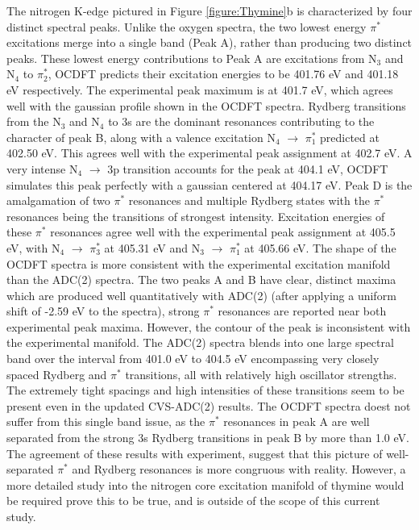 \documentclass[12pt]{article}
\begin{document}
The nitrogen K-edge pictured in Figure \ref{figure:Thymine}b is characterized by four distinct spectral peaks. Unlike the oxygen spectra, the two lowest energy $\pi^*$ excitations merge into a single band (Peak A), rather than producing two distinct peaks. These lowest energy contributions to Peak A are excitations from N$_3$ and N$_4$ to $\pi^*_2$, OCDFT predicts their excitation energies to be 401.76 eV and 401.18 eV respectively. The experimental peak maximum is at 401.7 eV, which agrees well with the gaussian profile shown in the OCDFT spectra. Rydberg transitions from the N$_3$ and N$_4$ to 3s are the dominant resonances contributing to the character of peak B, along with a valence excitation N$_4$ $\rightarrow$ $\pi^*_1$ predicted at 402.50 eV. This agrees well with the experimental peak assignment at 402.7 eV. A very intense N$_4$ $\rightarrow$ 3p transition accounts for the peak at 404.1 eV, OCDFT simulates this peak perfectly with a gaussian centered at 404.17 eV. Peak D is the amalgamation of two $\pi^*$ resonances and multiple Rydberg states with the $\pi^*$ resonances being the transitions of strongest intensity. Excitation energies of these $\pi^*$ resonances agree well with the experimental peak assignment at 405.5 eV, with N$_4$ $\rightarrow$ $\pi^*_3$ at 405.31 eV and N$_3$ $\rightarrow$ $\pi^*_1$ at 405.66 eV. The shape of the OCDFT spectra is more consistent with the experimental excitation manifold than the ADC(2) spectra. The two peaks A and B have clear, distinct maxima which are produced well quantitatively with ADC(2) (after applying a uniform shift of -2.59 eV to the spectra), strong $\pi^*$ resonances are reported near both experimental peak maxima. However, the contour of the peak is inconsistent with the experimental manifold. The ADC(2) spectra blends into one large spectral band over the interval from 401.0 eV to 404.5 eV encompassing very closely spaced Rydberg and $\pi^*$ transitions, all with relatively high oscillator strengths. The extremely tight spacings and high intensities of these transitions seem to be present even in the updated CVS-ADC(2) results. The OCDFT spectra doest not suffer from this single band issue, as the $\pi^*$ resonances in peak A are well separated from the strong 3s Rydberg transitions in peak B by more than 1.0 eV. The agreement of these results with experiment, suggest that this picture of well-separated $\pi^*$ and Rydberg resonances is more congruous with reality. However, a more detailed study into the nitrogen core excitation manifold of thymine would be required prove this to be true, and is outside of the scope of this current study.
\end{document}
